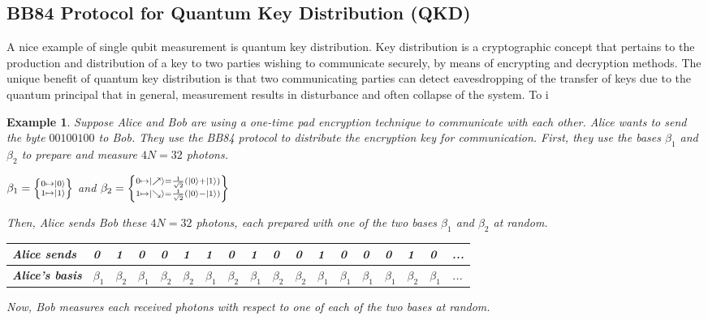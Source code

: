 \documentclass[12pt]{article}
\theoremstyle{plain}
\theoremstyle{nonumberplain}
\theoremstyle{plain}
\newtheorem{example}[lemma]{Example}
\theoremstyle{nonumberplain}
\newcommand\1{{\bf 1}}
\newcommand{\<}{\left\langle}
\renewcommand{\>}{\right\rangle}
\newcommand{\lb}{\left\{}
\newcommand{\rb}{\right\}}
\begin{document}
\subsection{BB84 Protocol for Quantum Key Distribution (QKD)}
A nice example of single qubit measurement is quantum key distribution. Key distribution is a cryptographic concept that pertains to the production and distribution of a key to two parties wishing to communicate securely, by means of encrypting and decryption methods. The unique benefit of quantum key distribution is that two communicating parties can detect eavesdropping of the transfer of keys due to the quantum principal that in general, measurement results in disturbance and often collapse of the system. To i
\begin{example}
Suppose Alice and Bob are using a \textit{one-time pad} encryption technique to communicate with each other. Alice wants to send the byte $00100100$ to Bob. They use the BB84 protocol to distribute the encryption key for communication. First, they use the bases $\beta_1$ and $\beta_2$ to prepare and measure $4N=32$ photons.
\begin{center}
$\beta_1=\lb\substack{0\mapsto\ket{0}\\1\mapsto\ket{1}}\rb$ and $\beta_2=\lb\substack{0\mapsto\ket{\nearrow}=\frac{1}{\sqrt{2}}(\ket{0}+\ket{1})\\1\mapsto\ket{\searrow}=\frac{1}{\sqrt{2}}(\ket{0}-\ket{1})}\rb$
\end{center}
Then, Alice sends Bob these $4N=32$ photons, each prepared with one of the two bases $\beta_1$ and $\beta_2$ at random.
\begin{center}
\begin{table}[h]
\centering
\begin{tabular}{|l|l|l|l|l|l|l|l|l|l|l|l|l|l|l|l|l|l}
\hline
\textbf{Alice sends} & 0 & 1 & 0 & 0 & 1 & 1 & 0 & 1 & 0 & 0 & 1 & 0 & 0 & 0 & 1 & 0 & ... \\ \hline
\textbf{Alice's basis} & $\beta_1$ & $\beta_2$ & $\beta_1$ & $\beta_2$ & $\beta_2$ & $\beta_1$ & $\beta_2$ & $\beta_1$ & $\beta_2$ & $\beta_2$ & $\beta_1$ & $\beta_1$ & $\beta_1$ & $\beta_1$ & $\beta_2$ & $\beta_1$ & ... \\ \hline
\end{tabular}
\end{table}
\end{center}
Now, Bob measures each received photons with respect to one of each of the two bases at random.
\begin{center}
\begin{table}[h]

\end{table}
\end{center}
\end{example}
\end{document}

